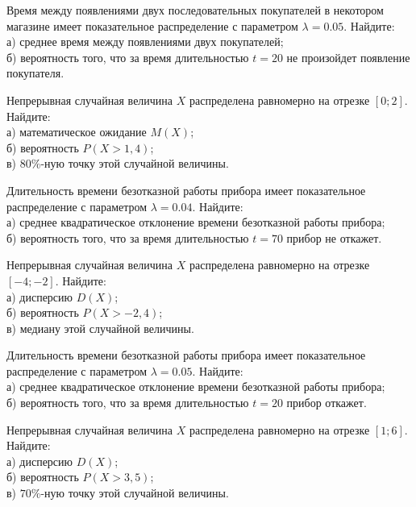 \z Время между появлениями двух последовательных покупателей в некотором магазине имеет показательное распределение с параметром $\lambda = 0.05$. Найдите: \\ \quad а) среднее время между появлениями двух покупателей; \\ \quad б) вероятность того, что за время длительностью $t = 20$ не произойдет появление покупателя.
 

\vfill

\newpage\setcounter{zad}{0}

\z Непрерывная случайная величина $X$ распределена равномерно на отрезке $[0; 2]$. Найдите: \\ \quad а) математическое ожидание $M(X)$; \\ \quad б) вероятность $P(X>1{,}4)$; \\ \quad в) $80\%$-ную точку этой случайной величины.


\vfill

\z Длительность времени безотказной работы прибора имеет показательное распределение с параметром $\lambda = 0.04$. Найдите: \\ \quad а) среднее квадратическое отклонение времени безотказной работы прибора; \\ \quad б) вероятность того, что за время длительностью $t = 70$ прибор не откажет.
 

\vfill

\newpage\setcounter{zad}{0}

\z Непрерывная случайная величина $X$ распределена равномерно на отрезке $[-4; -2]$. Найдите: \\ \quad а) дисперсию $D(X)$; \\ \quad б) вероятность $P(X>-2{,}4)$; \\ \quad в) медиану этой случайной величины.


\vfill

\z Длительность времени безотказной работы прибора имеет показательное распределение с параметром $\lambda = 0.05$. Найдите: \\ \quad а) среднее квадратическое отклонение времени безотказной работы прибора; \\ \quad б) вероятность того, что за время длительностью $t = 20$ прибор  откажет.
 

\vfill

\newpage\setcounter{zad}{0}

\z Непрерывная случайная величина $X$ распределена равномерно на отрезке $[1; 6]$. Найдите: \\ \quad а) дисперсию $D(X)$; \\ \quad б) вероятность $P(X>3{,}5)$; \\ \quad в) $70\%$-ную точку этой случайной величины.


